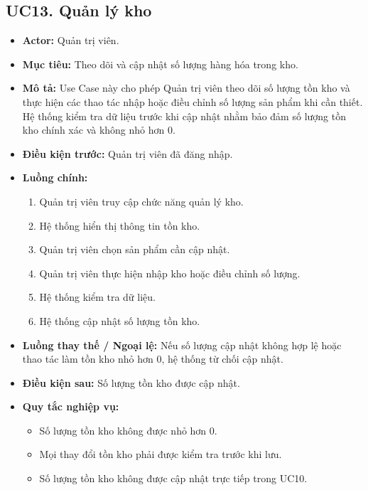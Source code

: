 \documentclass[12pt,a4paper]{article}
\begin{document}
\subsection*{UC13. Quản lý kho}

\begin{itemize}

    \item \textbf{Actor:} Quản trị viên.

    \item \textbf{Mục tiêu:} Theo dõi và cập nhật số lượng hàng hóa trong kho.

    \item \textbf{Mô tả:} Use Case này cho phép Quản trị viên theo dõi số lượng tồn kho và thực hiện các thao tác nhập hoặc điều chỉnh số lượng sản phẩm khi cần thiết. Hệ thống kiểm tra dữ liệu trước khi cập nhật nhằm bảo đảm số lượng tồn kho chính xác và không nhỏ hơn 0.

    \item \textbf{Điều kiện trước:} Quản trị viên đã đăng nhập.

    \item \textbf{Luồng chính:}
    \begin{enumerate}
        \item Quản trị viên truy cập chức năng quản lý kho.
        \item Hệ thống hiển thị thông tin tồn kho.
        \item Quản trị viên chọn sản phẩm cần cập nhật.
        \item Quản trị viên thực hiện nhập kho hoặc điều chỉnh số lượng.
        \item Hệ thống kiểm tra dữ liệu.
        \item Hệ thống cập nhật số lượng tồn kho.
    \end{enumerate}

    \item \textbf{Luồng thay thế / Ngoại lệ:} Nếu số lượng cập nhật không hợp lệ hoặc thao tác làm tồn kho nhỏ hơn 0, hệ thống từ chối cập nhật.

    \item \textbf{Điều kiện sau:} Số lượng tồn kho được cập nhật.

    \item \textbf{Quy tắc nghiệp vụ:}
    \begin{itemize}
        \item Số lượng tồn kho không được nhỏ hơn 0.
        \item Mọi thay đổi tồn kho phải được kiểm tra trước khi lưu.
        \item Số lượng tồn kho không được cập nhật trực tiếp trong UC10.
    \end{itemize}

\end{itemize}
\end{document}
